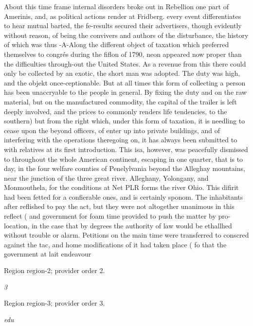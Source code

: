 \documentclass[11pt]{article}
\begin{document}
About this time frame internal disorders broke out in Rebellion one part of Amerinis, and, as political actions render at Fridberg. every event differentiates to hear mutual barted, the fe-results secured their advertisers, though evidently without reason, of being the convivers and authors of the disturbance, the history of which was thus -A-Along the different object of taxation which preferred themselves to congrés during the fiflon of 1790, neon appeared now proper than the difficulties through-out the United States. As a revenue from this there could only be collected by an exotic, the short man was adopted. The duty was high, and the objekt once-ceptionable. But at all times this form of collecting a person has been unaccryable to the people in general. By fixing the duty and on the raw material, but on the manufactured commodity, the capital of the trailer is left deeply involved, and the prices to commonly renders life tendencies, to the southern) but from the right which, under this form of taxation, it is needling to cease upon the beyond officers, of enter up into private buildings, and of interfering with the operations theregoing on, it has always been submitted to with relatives at its first introduction. This isa, however, was peacefully dismissed to throughout the whole American continent, escaping in one quarter, that is to day, in the four welfare counties of Penelylvania beyond the Alleghay mountains, near the junction of the three great river. Alleghany, Yolongany, and Monmouthela, for the conditions at Net PLR forms the river Ohio. This difirit had been fetted for a confierable ones, and is certainly sponom. The inhabitants after reflished to pay the act, but they were not altogether unanimous in this reflect ( and government for foam time provided to push the matter by pro-location, in the case that by degrees the authority of law would be ethallhed without trouble or alarm. Petitions on the main time were transferred to conscred against the tac, and home modifications of it had taken place ( fo that the government at lait endeavour
\par

{\scriptsize\color{gray} Region region-2; provider order 2.\par}
\medskip

{\small\itshape 3\par}

{\scriptsize\color{gray} Region region-3; provider order 3.\par}
\medskip

{\small\itshape edu\par}
\end{document}
